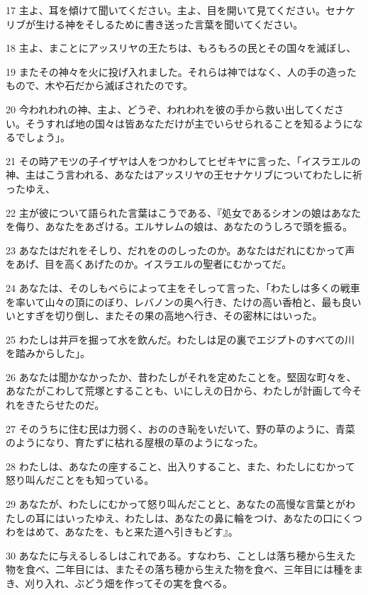 \par 17 主よ、耳を傾けて聞いてください。主よ、目を開いて見てください。セナケリブが生ける神をそしるために書き送った言葉を聞いてください。
\par 18 主よ、まことにアッスリヤの王たちは、もろもろの民とその国々を滅ぼし、
\par 19 またその神々を火に投げ入れました。それらは神ではなく、人の手の造ったもので、木や石だから滅ぼされたのです。
\par 20 今われわれの神、主よ、どうぞ、われわれを彼の手から救い出してください。そうすれば地の国々は皆あなただけが主でいらせられることを知るようになるでしょう」。
\par 21 その時アモツの子イザヤは人をつかわしてヒゼキヤに言った、「イスラエルの神、主はこう言われる、あなたはアッスリヤの王セナケリブについてわたしに祈ったゆえ、
\par 22 主が彼について語られた言葉はこうである、『処女であるシオンの娘はあなたを侮り、あなたをあざける。エルサレムの娘は、あなたのうしろで頭を振る。
\par 23 あなたはだれをそしり、だれをののしったのか。あなたはだれにむかって声をあげ、目を高くあげたのか。イスラエルの聖者にむかってだ。
\par 24 あなたは、そのしもべらによって主をそしって言った、「わたしは多くの戦車を率いて山々の頂にのぼり、レバノンの奥へ行き、たけの高い香柏と、最も良いいとすぎを切り倒し、またその果の高地へ行き、その密林にはいった。
\par 25 わたしは井戸を掘って水を飲んだ。わたしは足の裏でエジプトのすべての川を踏みからした」。
\par 26 あなたは聞かなかったか、昔わたしがそれを定めたことを。堅固な町々を、あなたがこわして荒塚とすることも、いにしえの日から、わたしが計画して今それをきたらせたのだ。
\par 27 そのうちに住む民は力弱く、おののき恥をいだいて、野の草のように、青菜のようになり、育たずに枯れる屋根の草のようになった。
\par 28 わたしは、あなたの座すること、出入りすること、また、わたしにむかって怒り叫んだことをも知っている。
\par 29 あなたが、わたしにむかって怒り叫んだことと、あなたの高慢な言葉とがわたしの耳にはいったゆえ、わたしは、あなたの鼻に輪をつけ、あなたの口にくつわをはめて、あなたを、もと来た道へ引きもどす』。
\par 30 あなたに与えるしるしはこれである。すなわち、ことしは落ち穂から生えた物を食べ、二年目には、またその落ち穂から生えた物を食べ、三年目には種をまき、刈り入れ、ぶどう畑を作ってその実を食べる。
